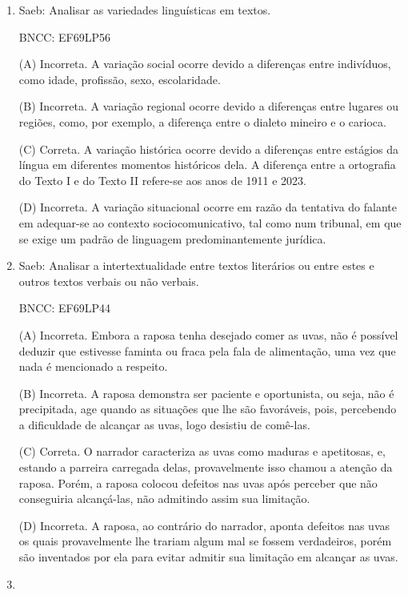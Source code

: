 \begin{enumerate}

	\item
Saeb: Analisar as variedades linguísticas em textos.

BNCC: EF69LP56

(A) Incorreta. A variação social ocorre devido a diferenças entre
indivíduos, como idade, profissão, sexo, escolaridade.

(B) Incorreta. A variação regional ocorre devido a diferenças entre
lugares ou regiões, como, por exemplo, a diferença entre o dialeto
mineiro e o carioca.

(C) Correta. A variação histórica ocorre devido a diferenças entre
estágios da língua em diferentes momentos históricos dela. A diferença
entre a ortografia do Texto I e do Texto II refere-se aos anos de 1911 e
2023.

(D) Incorreta. A variação situacional ocorre em razão da tentativa do
falante em adequar-se ao contexto sociocomunicativo, tal como num
tribunal, em que se exige um padrão de linguagem predominantemente
jurídica.


\item

Saeb: Analisar a intertextualidade entre textos literários ou entre
estes e outros textos verbais ou não verbais.

BNCC: EF69LP44

(A) Incorreta. Embora a raposa tenha desejado comer as uvas, não é
possível deduzir que estivesse faminta ou fraca pela fala de
alimentação, uma vez que nada é mencionado a respeito.

(B) Incorreta. A raposa demonstra ser paciente e oportunista, ou seja,
não é precipitada, age quando as situações que lhe são favoráveis, pois,
percebendo a dificuldade de alcançar as uvas, logo desistiu de comê-las.

(C) Correta. O narrador caracteriza as uvas como maduras e apetitosas,
e, estando a parreira carregada delas, provavelmente isso chamou a
atenção da raposa. Porém, a raposa colocou defeitos nas uvas após
perceber que não conseguiria alcançá-las, não admitindo assim sua
limitação.

(D) Incorreta. A raposa, ao contrário do narrador, aponta defeitos nas
uvas os quais provavelmente lhe trariam algum mal se fossem verdadeiros,
porém são inventados por ela para evitar admitir sua limitação em
alcançar as uvas.

\item


\end{enumerate}
